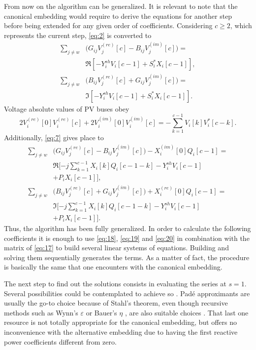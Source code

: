 \documentclass[conference]{IEEEtran}
\begin{document}
From now on the algorithm can be generalized. It is relevant to note that the canonical embedding would require to derive the equations for another step before being extended for any given order of coefficients. Considering $c\geq 2$, which represents the current step, \eqref{eq:2} is converted to
\begin{equation}
  \begin{split}
    \sum_{j\neq w}&\biggl(G_{ij}V^{(re)}_j[c]-B_{ij}V^{(im)}_j[c]\biggr)=\\
    &\Re[ - Y^{sh}_iV_i[c-1]+S^*_iX_i[c-1]],\\
    \sum_{j\neq w}&\biggl(B_{ij}V^{(re)}_j[c]+G_{ij}V^{(im)}_j[c]\biggr)=\\
    &\Im[ - Y^{sh}_iV_i[c-1]+S^*_iX_i[c-1]].
  \end{split}
  \label{eq:18}
\end{equation}
Voltage absolute values of PV buses obey
\begin{equation}
 2V^{(re)}_i[0]V^{(re)}_i[c]+2V^{(im)}_i[0]V^{(im)}_i[c]=-\sum_{k=1}^{c-1}V_i[k]V^*_i[c-k].
  \label{eq:19}
\end{equation}
Additionally, \eqref{eq:7} gives place to
\begin{equation}
  \begin{split}
    \sum_{j\neq w}&\biggl(G_{ij}V^{(re)}_j[c]-B_{ij}V^{(im)}_j[c]\biggr)-X^{(im)}_i[0]Q_i[c-1]=\\
    &\Re[ -j\sum_{k=1}^{c-1}X_i[k]Q_i[c-1-k]- Y^{sh}_iV_i[c-1]\\
    &+P_iX_i[c-1]],\\
    \sum_{j\neq w}&\biggl(B_{ij}V^{(re)}_j[c]+G_{ij}V^{(im)}_j[c]\biggr)+X^{(re)}_i[0]Q_i[c-1]=\\
    &\Im[-j\sum_{k=1}^{c-1}X_i[k]Q_i[c-1-k] - Y^{sh}_iV_i[c-1]\\
    &+P_iX_i[c-1]].
  \end{split}
  \label{eq:20}
\end{equation}
Thus, the algorithm has been fully generalized. In order to calculate the following coefficients it is enough to use \eqref{eq:18}, \eqref{eq:19} and \eqref{eq:20} in combination with the matrix of \eqref{eq:17} to build several linear systems of equations. Building and solving them sequentially generates the terms. As a matter of fact, the procedure is basically the same that one encounters with the canonical embedding. 

The next step to find out the solutions consists in evaluating the series at $s=1$. Several possibilities could be contemplated to achieve so \cite{Trias2018}. Padé approximants are usually the go-to choice because of Stahl's theorem, even though recursive methods such as Wynn's $\varepsilon$ or Bauer's $\eta$ \cite{weniger},\cite{graves} are also suitable choices \cite{Rao}. That last one resource is not totally appropriate for the canonical embedding, but offers no inconvenience with the alternative embedding due to having the first reactive power coefficients different from zero.
\end{document}
